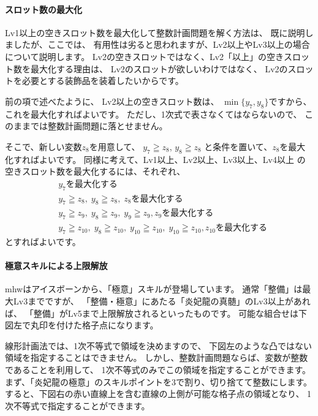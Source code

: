 \documentclass{jsarticle}
\begin{document}
\paragraph{スロット数の最大化}
Lv1以上の空きスロット数を最大化して整数計画問題を解く方法は、
既に説明しましたが、ここでは、
有用性は劣ると思われますが、Lv2以上やLv3以上の場合について説明します。
Lv2の空きスロットではなく、Lv2「以上」の空きスロット数を最大化する理由は、
Lv2のスロットが欲しいわけではなく、
Lv2のスロットを必要とする装飾品を装着したいからです。

前の項で述べたように、
Lv2以上の空きスロット数は、
$\min\{y_7,y_8\}$ですから、これを最大化すればよいです。
ただし、1次式で表さなくてはならないので、
このままでは整数計画問題に落とせません。

そこで、新しい変数$z_8$を用意して、
$y_7 \geqq z_8$,
$y_8 \geqq z_8$
と条件を置いて、$z_8$を最大化すればよいです。
同様に考えて、Lv1以上、Lv2以上、Lv3以上、Lv4以上
の空きスロット数を最大化するには、それぞれ、
%
\begin{align*}
& y_7 \text{を最大化する} \tag{Lv1空きスロット数を最大化}
\\
& y_7 \geqq z_8, \;  y_8 \geqq z_8, \; 
z_8 \text{を最大化する} \tag{Lv2空きスロット数を最大化}
\\
& y_7 \geqq z_9, \;  y_8 \geqq z_9, \; y_9 \geqq z_9,
z_9 \text{を最大化する} \tag{Lv3空きスロット数を最大化}
\\
& y_7 \geqq z_{10}, \;  y_8 \geqq z_{10}, \; y_{10} \geqq z_{10}, \; y_{10} \geqq z_{10},
z_{10} \text{を最大化する} \tag{Lv4空きスロット数を最大化}
\end{align*}
とすればよいです。

\paragraph{極意スキルによる上限解放}
mhwはアイスボーンから、「極意」スキルが登場しています。
通常「整備」は最大Lv3までですが、
「整備・極意」にあたる「炎妃龍の真髄」のLv3以上があれば、
「整備」がLv5まで上限解放されるといったものです。
可能な組合せは下図左で丸印を付けた格子点になります。

線形計画法では、1次不等式で領域を決めますので、
下図左のような凸ではない領域を指定することはできません。
しかし、整数計画問題ならば、変数が整数であることを利用して、
1次不等式のみでこの領域を指定することができます。
%
まず、「炎妃龍の極意」のスキルポイントを3で割り、切り捨てて整数にします。
すると、下図右の赤い直線上を含む直線の上側が可能な格子点の領域となり、
1次不等式で指定することができます。
\end{document}

